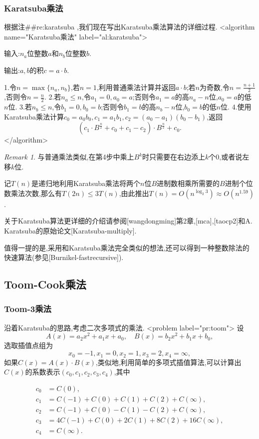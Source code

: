 \documentclass{ctexart}
\newcommand\mtcasCite[1]{[#1]}
\theoremstyle{remark}
\newtheorem{remark}{Remark}
\theoremstyle{definition}
\begin{document}
\subsubsection{Karatsuba乘法}

根据注##re:karatsuba ,我们现在写出Karatsuba乘法算法的详细过程.
<algorithm  name="Karatsuba乘法" label="al:karatsuba">

输入:$n_a$位整数$a$和$n_b$位整数$b$.

输出:$a,b$的积$c=a\cdot b$.

 1.令$n=\max\{n_a,n_b\}$,若$n=1$,利用普通乘法计算并返回$a\cdot b$;若$n$为奇数,令$n=\frac{n+1}{2}$,否则令$n=\frac{n}{2}$.
 2.若$n_a\le n$,令$a_1=0,a_0=a$;否则令$a_1=a$的高$n_a-n$位,$a_0=a$的低$n$位.
 3.若$n_b\le n$,令$b_1=0,b_0=b$;否则令$b_1=b$的高$n_b-n$位,$b_0=b$的低$n$位. 
 4.使用Karatsuba乘法计算$c_0=a_0b_0,c_1=a_1b_1,c_2=(a_0-a_1)(b_0-b_1)$,返回$$(c_1\cdot B^{\frac{n}{2}}+c_0+c_1-c_2)\cdot B^{\frac{n}{2}}+c_0.$$
</algorithm>
\begin{remark}
与普通乘法类似,在第4步中乘上$B^k$时只需要在右边添上$k$个0,或者说左移$k$位.
\end{remark}
记$T(n)$是递归地利用Karatsuba乘法将两个$n$位$B$进制数相乘所需要的$B$进制个位数乘法次数,那么有$T(2n)\le 3T(n)$,由此推出$T(n)=O(n^{\log_2{3}})\approx O(n^{1.59})$.

关于Karatsuba算法更详细的介绍请参阅\mtcasCite{wangdongming}第2章,\mtcasCite{mca},\mtcasCite{taocp2}和A. Karatsuba的原始论文\mtcasCite{Karatsuba-multiply}.

值得一提的是,采用和Karatsuba乘法完全类似的想法,还可以得到一种整数除法的快速算法(参见\mtcasCite{Burnikel-fastrecursive}).

\subsection{Toom-Cook乘法}

\subsubsection{Toom-3乘法}

沿着Karatsuba的思路,考虑二次多项式的乘法.
<problem label="pr:toom">
设$$A(x)=a_2x^2+a_1x+a_0,\quad B(x)=b_2x^2+b_1x+b_0,$$选取插值点组为$$x_0=-1,x_1=0,x_2=1,x_3=2,x_4=\infty,$$如果$C(x)=A(x)\cdot B(x)$,类似地,利用简单的多项式插值算法,可以计算出$C(x) $的系数表示$(c_0,c_1,c_2,c_3,c_4)$,其中

\begin{align*}
c_0&=C(0),\\
c_1&=C(-1)+C(0)+C(1)+C(2)+C(\infty),\\
c_2&=C(-1)+C(0)-C(1)-C(2)+C(\infty),\\
c_3&=4C(-1)+C(0)+2C(1)+8C(2)+16C(\infty),\\
c_4&=C(\infty).
\end{align*}
\end{document}
